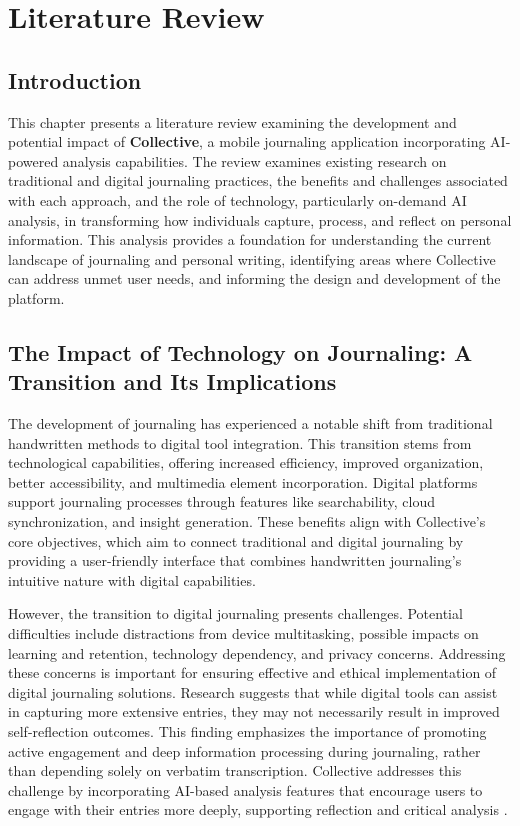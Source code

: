 \chapter{Literature Review}\label{ch:literature}

\section{Introduction}\label{sec:intro}

This chapter presents a literature review examining the development and potential impact of \textbf{Collective}, a mobile journaling application incorporating AI-powered analysis capabilities. The review examines existing research on traditional and digital journaling practices, the benefits and challenges associated with each approach, and the role of technology, particularly on-demand AI analysis, in transforming how individuals capture, process, and reflect on personal information. This analysis provides a foundation for understanding the current landscape of journaling and personal writing, identifying areas where Collective can address unmet user needs, and informing the design and development of the platform.

\section{The Impact of Technology on Journaling: A Transition and Its Implications}\label{sec:technology-impact}

The development of journaling has experienced a notable shift from traditional handwritten methods to digital tool integration. This transition stems from technological capabilities, offering increased efficiency, improved organization, better accessibility, and multimedia element incorporation. Digital platforms support journaling processes through features like searchability, cloud synchronization, and insight generation. These benefits align with Collective's core objectives, which aim to connect traditional and digital journaling by providing a user-friendly interface that combines handwritten journaling's intuitive nature with digital capabilities.

However, the transition to digital journaling presents challenges. Potential difficulties include distractions from device multitasking, possible impacts on learning and retention, technology dependency, and privacy concerns. Addressing these concerns is important for ensuring effective and ethical implementation of digital journaling solutions. Research suggests that while digital tools can assist in capturing more extensive entries, they may not necessarily result in improved self-reflection outcomes. This finding emphasizes the importance of promoting active engagement and deep information processing during journaling, rather than depending solely on verbatim transcription. Collective addresses this challenge by incorporating AI-based analysis features that encourage users to engage with their entries more deeply, supporting reflection and critical analysis \cite{baikadi2016exploring}.

